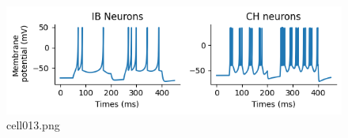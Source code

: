 \begin{figure}[ht]
	\centering
	\includegraphics[scale=0.8, max width=\linewidth]{./fig/neuron-model/izhikevich/cell013.png}
	\caption{cell013.png}
	\label{cell013.png}
\end{figure}